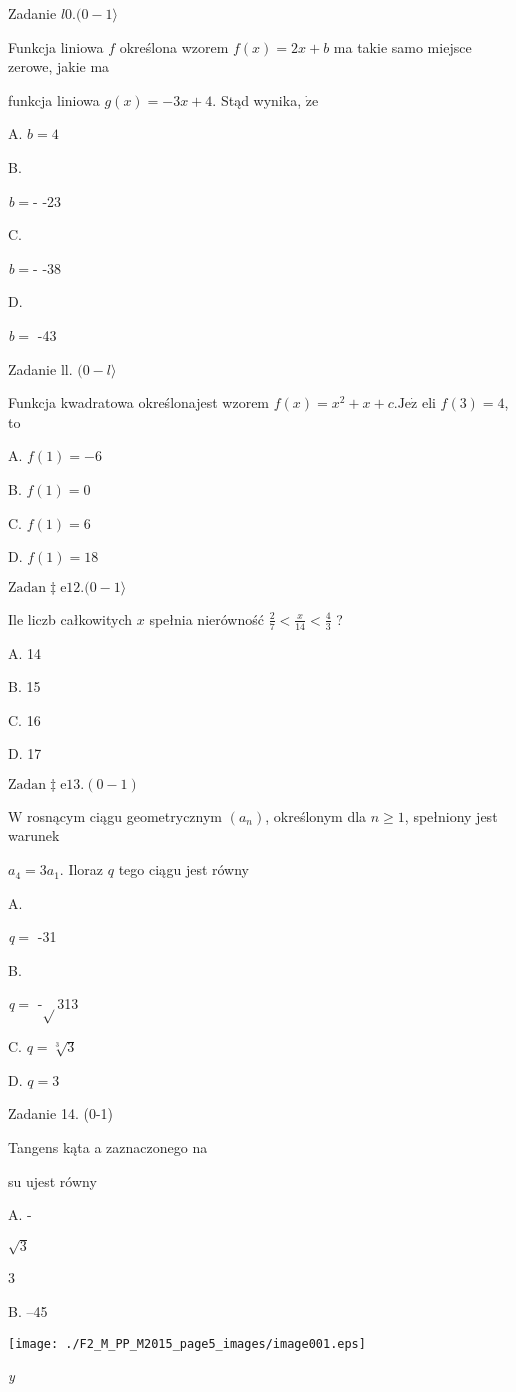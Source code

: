 \documentclass[a4paper,12pt]{article}
\begin{document}
Zadanie $l0. (0-1\rangle$

Funkcja liniowa $f$ określona wzorem $f(x)=2x+b$ ma takie samo miejsce zerowe, jakie ma

funkcja liniowa $g(x)=-3x+4$. Stąd wynika, $\dot{\mathrm{z}}\mathrm{e}$

A. $b=4$

B.

{\it b}$=$- -23

C.

{\it b}$=$- -38

D.

{\it b}$=$ -43

Zadanie ll. $(0-l\rangle$

Funkcja kwadratowa określonajest wzorem $f(x)=x^{2}+x+c. \mathrm{J}\mathrm{e}\dot{\mathrm{z}}$ eli $f(3)=4$, to

A. $f(1)=-6$

B. $f(1)=0$

C. $f(1)=6$

D. $f(1)=18$

$\mathrm{Z}\mathrm{a}\mathrm{d}\mathrm{a}\mathrm{n}\ddagger \mathrm{e}12. (0-1\rangle$

Ile liczb całkowitych $x$ spełnia nierówność $\displaystyle \frac{2}{7}<\frac{x}{14}<\frac{4}{3}$ ?

A. 14

B. 15

C. 16

D. 17

$\mathrm{Z}\mathrm{a}\mathrm{d}\mathrm{a}\mathrm{n}\ddagger \mathrm{e}13. (0-1)$

$\mathrm{W}$ rosnącym ciągu geometrycznym $(a_{n})$, określonym dla $n\geq 1$, spełniony jest warunek

$a_{4}=3a_{1}$. Iloraz $q$ tego ciągu jest równy

A.

{\it q}$=$ -31

B.

{\it q}$=$ -$\sqrt{}$313

C. $q=\sqrt[3]{3}$

D. $q=3$

Zadanie 14. (0-1)

Tangens kąta a zaznaczonego na

su ujest równy

A. -

$\sqrt{3}$

3

B. --45
\begin{center}
\texttt{[image: ./F2\_M\_PP\_M2015\_page5\_images/image001.eps]}
\end{center}
{\it y}
\end{document}
